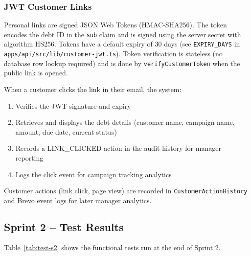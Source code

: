 \documentclass[12pt,a4paper]{report}
\begin{document}
\subsubsection{JWT Customer Links}

Personal links are signed JSON Web Tokens (HMAC-SHA256).
The token encodes the debt ID in the \texttt{sub} claim and is signed using the
server secret with algorithm HS256.
Tokens have a default expiry of 30 days (see \texttt{EXPIRY\_DAYS} in
\texttt{apps/api/src/lib/customer-jwt.ts}).
Token verification is stateless (no database row lookup required) and is done by
\texttt{verifyCustomerToken} when the public link is opened.

When a customer clicks the link in their email, the system:

\begin{enumerate}
  \item Verifies the JWT signature and expiry
  \item Retrieves and displays the debt details (customer name, campaign name, amount, due date, current status)
  \item Records a LINK\_CLICKED action in the audit history for manager reporting
  \item Logs the click event for campaign tracking analytics
\end{enumerate}

Customer actions (link click, page view) are recorded in \texttt{CustomerActionHistory} and Brevo event logs for later manager analytics.

\subsection{Sprint 2 -- Test Results}

Table~\ref{tab:test-s2} shows the functional tests run at the end of Sprint 2.
\end{document}
